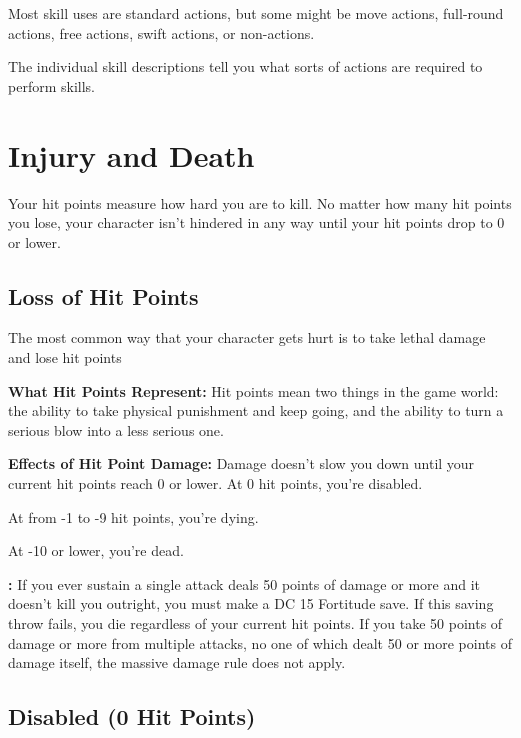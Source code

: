 Most skill uses are standard actions, but some might be move actions, full-round actions, free actions, swift actions, or non-actions.

The individual skill descriptions tell you what sorts of actions are required to perform skills.

\section{Injury and Death}

Your hit points measure how hard you are to kill. No matter how many hit points you lose, your character isn't hindered in any way until your hit points drop to 0 or lower.

\subsection{Loss of Hit Points}

The most common way that your character gets hurt is to take lethal damage and lose hit points

\textbf{What Hit Points Represent:} Hit points mean two things in the game world: the ability to take physical punishment and keep going, and the ability to turn a serious blow into a less serious one.

\textbf{Effects of Hit Point Damage:} Damage doesn't slow you down until your current hit points reach 0 or lower. At 0 hit points, you're disabled.

At from -1 to -9 hit points, you're dying.

At -10 or lower, you're dead.

\textbf{:} If you ever sustain a single attack deals 50 points of damage or more and it doesn't kill you outright, you must make a DC 15 Fortitude save. If this saving throw fails, you die regardless of your current hit points. If you take 50 points of damage or more from multiple attacks, no one of which dealt 50 or more points of damage itself, the massive damage rule does not apply.

\subsection{Disabled (0 Hit Points)}

